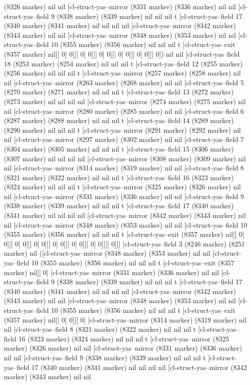 {{(8326 marker) nil nil [cl-struct-yas--mirror (8331 marker) (8336 marker) nil nil [cl-struct-yas--field 9 (8338 marker) (8339 marker) nil nil nil t [cl-struct-yas--field 17 (8340 marker) (8341 marker) nil nil nil nil [cl-struct-yas--mirror (8342 marker) (8343 marker) nil nil [cl-struct-yas--mirror (8348 marker) (8353 marker) nil nil [cl-struct-yas--field 10 (8355 marker) (8356 marker) nil nil nil t [cl-struct-yas--exit (8357 marker) nil]] 0] 0]]] 0] 0]]] 0] 0]]] 0] 0]]] 0] 0]]] 0]) nil nil [cl-struct-yas--field 18 (8253 marker) (8254 marker) nil nil nil t [cl-struct-yas--field 12 (8255 marker) (8256 marker) nil nil nil t [cl-struct-yas--mirror (8257 marker) (8258 marker) nil nil [cl-struct-yas--mirror (8263 marker) (8268 marker) nil nil [cl-struct-yas--field 5 (8270 marker) (8271 marker) nil nil nil t [cl-struct-yas--field 13 (8272 marker) (8273 marker) nil nil nil nil [cl-struct-yas--mirror (8274 marker) (8275 marker) nil nil [cl-struct-yas--mirror (8280 marker) (8285 marker) nil nil [cl-struct-yas--field 6 (8287 marker) (8288 marker) nil nil nil t [cl-struct-yas--field 14 (8289 marker) (8290 marker) nil nil nil t [cl-struct-yas--mirror (8291 marker) (8292 marker) nil nil [cl-struct-yas--mirror (8297 marker) (8302 marker) nil nil [cl-struct-yas--field 7 (8304 marker) (8305 marker) nil nil nil t [cl-struct-yas--field 15 (8306 marker) (8307 marker) nil nil nil nil [cl-struct-yas--mirror (8308 marker) (8309 marker) nil nil [cl-struct-yas--mirror (8314 marker) (8319 marker) nil nil [cl-struct-yas--field 8 (8321 marker) (8322 marker) nil nil nil t [cl-struct-yas--field 16 (8323 marker) (8324 marker) nil nil nil t [cl-struct-yas--mirror (8325 marker) (8326 marker) nil nil [cl-struct-yas--mirror (8331 marker) (8336 marker) nil nil [cl-struct-yas--field 9 (8338 marker) (8339 marker) nil nil nil t [cl-struct-yas--field 17 (8340 marker) (8341 marker) nil nil nil nil [cl-struct-yas--mirror (8342 marker) (8343 marker) nil nil [cl-struct-yas--mirror (8348 marker) (8353 marker) nil nil [cl-struct-yas--field 10 (8355 marker) (8356 marker) nil nil nil t [cl-struct-yas--exit (8357 marker) nil]] 0] 0]]] 0] 0]]] 0] 0]]] 0] 0]]] 0] 0]]] 0] 0]]]] 0]]] [cl-struct-yas--field 3 (8246 marker) (8251 marker) nil ([cl-struct-yas--mirror (8348 marker) (8353 marker) nil nil [cl-struct-yas--field 10 (8355 marker) (8356 marker) nil nil nil t [cl-struct-yas--exit (8357 marker) nil]] 0] [cl-struct-yas--mirror (8331 marker) (8336 marker) nil nil [cl-struct-yas--field 9 (8338 marker) (8339 marker) nil nil nil t [cl-struct-yas--field 17 (8340 marker) (8341 marker) nil nil nil nil [cl-struct-yas--mirror (8342 marker) (8343 marker) nil nil [cl-struct-yas--mirror (8348 marker) (8353 marker) nil nil [cl-struct-yas--field 10 (8355 marker) (8356 marker) nil nil nil t [cl-struct-yas--exit (8357 marker) nil]] 0] 0]]] 0] [cl-struct-yas--mirror (8314 marker) (8319 marker) nil nil [cl-struct-yas--field 8 (8321 marker) (8322 marker) nil nil nil t [cl-struct-yas--field 16 (8323 marker) (8324 marker) nil nil nil t [cl-struct-yas--mirror (8325 marker) (8326 marker) nil nil [cl-struct-yas--mirror (8331 marker) (8336 marker) nil nil [cl-struct-yas--field 9 (8338 marker) (8339 marker) nil nil nil t [cl-struct-yas--field 17 (8340 marker) (8341 marker) nil nil nil nil [cl-struct-yas--mirror (8342 marker) (8343 marker) nil nil }}
